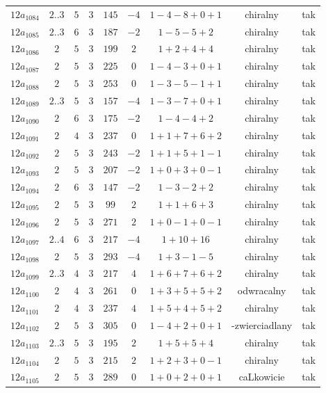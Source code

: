 \begin{longtable}{ccccccccc}
$12a_{1084}$ & $2..3$ & $5$ & $3$ & $145$ & $-4$ & $1-4-8+0+1$ & chiralny & tak \\
$12a_{1085}$ & $2..3$ & $6$ & $3$ & $187$ & $-2$ & $1-5-5+2$ & chiralny & tak \\
$12a_{1086}$ & $2$ & $5$ & $3$ & $199$ & $2$ & $1+2+4+4$ & chiralny & tak \\
$12a_{1087}$ & $2$ & $5$ & $3$ & $225$ & $0$ & $1-4-3+0+1$ & chiralny & tak \\
$12a_{1088}$ & $2$ & $5$ & $3$ & $253$ & $0$ & $1-3-5-1+1$ & chiralny & tak \\
$12a_{1089}$ & $2..3$ & $5$ & $3$ & $157$ & $-4$ & $1-3-7+0+1$ & chiralny & tak \\
$12a_{1090}$ & $2$ & $6$ & $3$ & $175$ & $-2$ & $1-4-4+2$ & chiralny & tak \\
$12a_{1091}$ & $2$ & $4$ & $3$ & $237$ & $0$ & $1+1+7+6+2$ & chiralny & tak \\
$12a_{1092}$ & $2$ & $5$ & $3$ & $243$ & $-2$ & $1+1+5+1-1$ & chiralny & tak \\
$12a_{1093}$ & $2$ & $5$ & $3$ & $207$ & $-2$ & $1+0+3+0-1$ & chiralny & tak \\
$12a_{1094}$ & $2$ & $6$ & $3$ & $147$ & $-2$ & $1-3-2+2$ & chiralny & tak \\
$12a_{1095}$ & $2$ & $5$ & $3$ & $99$ & $2$ & $1+1+6+3$ & chiralny & tak \\
$12a_{1096}$ & $2$ & $5$ & $3$ & $271$ & $2$ & $1+0-1+0-1$ & chiralny & tak \\
$12a_{1097}$ & $2..4$ & $6$ & $3$ & $217$ & $-4$ & $1+10+16$ & chiralny & tak \\
$12a_{1098}$ & $2$ & $5$ & $3$ & $293$ & $-4$ & $1+3-1-5$ & chiralny & tak \\
$12a_{1099}$ & $2..3$ & $4$ & $3$ & $217$ & $4$ & $1+6+7+6+2$ & chiralny & tak \\
$12a_{1100}$ & $2$ & $4$ & $3$ & $261$ & $0$ & $1+3+5+5+2$ & odwracalny & tak \\
$12a_{1101}$ & $2$ & $4$ & $3$ & $237$ & $4$ & $1+5+4+5+2$ & chiralny & tak \\
$12a_{1102}$ & $2$ & $5$ & $3$ & $305$ & $0$ & $1-4+2+0+1$ & -zwierciadlany & tak \\
$12a_{1103}$ & $2..3$ & $5$ & $3$ & $195$ & $2$ & $1+5+5+4$ & chiralny & tak \\
$12a_{1104}$ & $2$ & $5$ & $3$ & $215$ & $2$ & $1+2+3+0-1$ & chiralny & tak \\
$12a_{1105}$ & $2$ & $5$ & $3$ & $289$ & $0$ & $1+0+2+0+1$ & caLkowicie & tak \\

\end{longtable}
